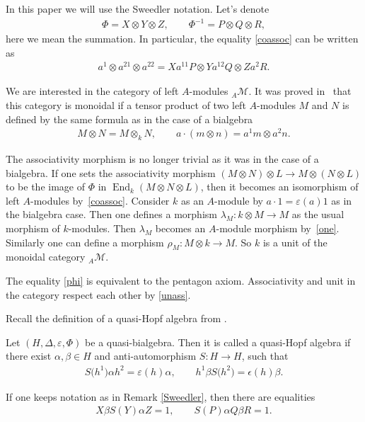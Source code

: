 \documentclass[10pt,a4paper]{amsart}
\numberwithin{equation}{section}
\begin{document}
 \begin{Remark}\label{Sweedler}In this paper we will use the Sweedler notation. Let's denote
 \begin{gather*}
 \Phi = X \otimes Y \otimes Z, \qquad \Phi^{-1} = P \otimes Q \otimes R ,
 \end{gather*}
here we mean the summation. In particular, the equality \eqref{coassoc} can be written as
\begin{gather*}
a^1\otimes a^{21}\otimes a^{22} = Xa^{11}P\otimes Ya^{12}Q \otimes Z a^2 R.
\end{gather*}
\end{Remark}

We are interested in the category of left $A$-modules $_A\mathcal{M}$. It was proved in~\cite{Drinfeld} that this category is monoidal if a tensor product of two left $A$-modules $M$ and $N$ is defined by the same formula as in the case of a bialgebra
\begin{gather*}
 M \otimes N = M \otimes_k N, \qquad a\cdot (m\otimes n) = a^1m\otimes a^2n.
\end{gather*}

The associativity morphism is no longer trivial as it was in the case of a bialgebra. If one sets the associativity morphism $(M \otimes N)\otimes L \rightarrow M \otimes (N\otimes L)$ to be the image of $\Phi$ in $\operatorname{End}_k(M \otimes N \otimes L)$, then it becomes an isomorphism of left $A$-modules by~\eqref{coassoc}. Consider $k$ as an $A$-module by $a \cdot 1 = \varepsilon(a) 1 $ as in the bialgebra case. Then one defines a morphism $\lambda_M\colon k \otimes M \rightarrow M $ as the usual morphism of $k$-modules. Then $\lambda_M$ becomes an $A$-module morphism by~\eqref{one}. Similarly one can define a morphism $\rho_M\colon M\otimes k \rightarrow M $. So $k$ is a unit of the monoidal category $_A\mathcal{M}$.

\begin{Remark}The equality \eqref{phi} is equivalent to the pentagon axiom. Associativity and unit in the category respect each other by \eqref{unass}.
 \end{Remark}

Recall the definition of a quasi-Hopf algebra from \cite{Drinfeld}.

\begin{Definition} Let $(H, \Delta, \varepsilon, \Phi)$ be a quasi-bialgebra. Then it is called a quasi-Hopf algebra if there exist $\alpha, \beta \in H $ and anti-automorphism $S\colon H \rightarrow H$, such that
 \begin{gather*}
 S\big(h^1\big)\alpha h^2 = \varepsilon(h) \alpha, \qquad h^1 \beta S\big(h^2\big) = \epsilon(h) \beta .
 \end{gather*}

If one keeps notation as in Remark \ref{Sweedler}, then there are equalities
 \begin{gather*}
 X \beta S(Y) \alpha Z = 1, \qquad S(P) \alpha Q \beta R = 1.
 \end{gather*}
\end{Definition}
\end{document}

